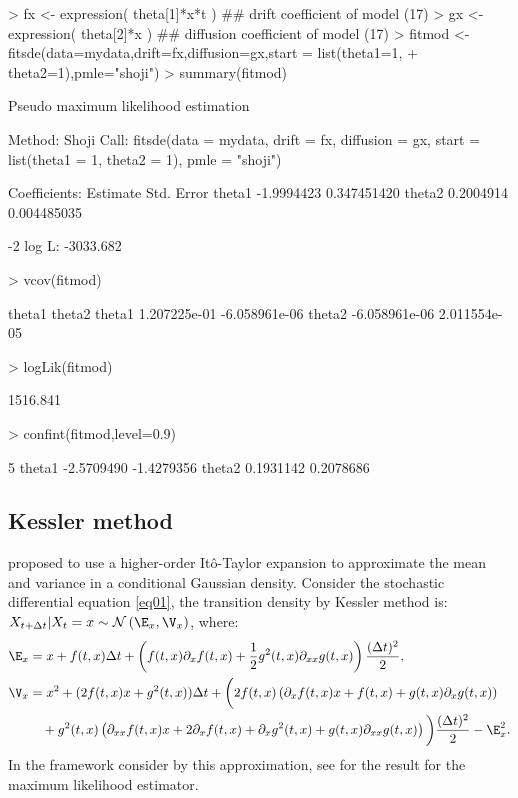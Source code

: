 \begin{Schunk}
\begin{Sinput}
> fx <- expression( theta[1]*x*t ) ## drift coefficient of model (17)
> gx <- expression( theta[2]*x )   ## diffusion coefficient of model (17)
> fitmod <- fitsde(data=mydata,drift=fx,diffusion=gx,start = list(theta1=1,
+                  theta2=1),pmle="shoji")
> summary(fitmod)
\end{Sinput}
\begin{Soutput}
Pseudo maximum likelihood estimation

Method:  Shoji
Call:
fitsde(data = mydata, drift = fx, diffusion = gx, start = list(theta1 = 1,
    theta2 = 1), pmle = "shoji")

Coefficients:
         Estimate  Std. Error
theta1 -1.9994423 0.347451420
theta2  0.2004914 0.004485035

-2 log L: -3033.682
\end{Soutput}
\begin{Sinput}
> vcov(fitmod)
\end{Sinput}
\begin{Soutput}
              theta1        theta2
theta1  1.207225e-01 -6.058961e-06
theta2 -6.058961e-06  2.011554e-05
\end{Soutput}
\begin{Sinput}
> logLik(fitmod)
\end{Sinput}
\begin{Soutput}
[1] 1516.841
\end{Soutput}
\begin{Sinput}
> confint(fitmod,level=0.9)
\end{Sinput}
\begin{Soutput}
              5 %
theta1 -2.5709490 -1.4279356
theta2  0.1931142  0.2078686
\end{Soutput}
\end{Schunk}

\subsection{Kessler method}

\citet{Kessler1997} proposed to use a higher-order It\^{o}-Taylor expansion to approximate the mean and variance in a conditional Gaussian density. Consider the stochastic differential equation \eqref{eq01}, the transition density by Kessler method is: $X_{t+\Delta t}|X_{t} = x \sim \mathcal{N}\left(\E_{x},\V_{x}\right)$, where:
\begin{align}\label{eq16}
  \E_{x} &= x + f(t,x) \Delta t+\left(f(t,x)\partial_{x}f(t,x) + \frac{1}{2} g^{2}(t,x) \partial_{xx}g(t,x)\right)\frac{(\Delta t)^2}{2}, \\
  \V_{x} &= x^2 +(2f(t,x)x+g^{2}(t,x)) \Delta t +\bigg(2f(t,x)\left(\partial_{x}f(t,x)x+f(t,x)+g(t,x)\partial_{x}g(t,x)\right) \nonumber\\
         &\quad+g^{2}(t,x)\left(\partial_{xx}f(t,x)x+2\partial_{x}f(t,x)+\partial_{x}g^{2}(t,x)+g(t,x)\partial_{xx}g(t,x)\right)\bigg)\frac{(\Delta t)^2}{2}-\E^{2}_{x}.
\end{align}
In the framework consider by this approximation, see \citet{Kessler1997} for the result  for the maximum likelihood estimator.

